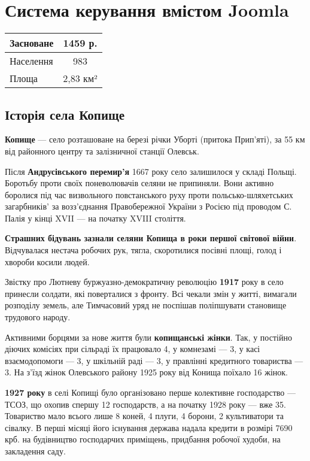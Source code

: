 \section {Система керування вмістом Joomla}


\begin{center}
	\begin{tabular}{| l | c |}
		\hline
		Засноване  & 1459 р.\\ 
		\hline
		Населення & 983 \\ 
		\hline 
		Площа & 2,83 км² \\   
		\hline
	\end{tabular}
\end{center}

\subsection{Історія села Копище}

\textbf{Копище} — село розташоване на березі річки Уборті (притока Прип’яті), за 55 км від районного центру та залізничної станції Олевськ.

Після \textbf{Андрусівського перемир’я} 1667 року село залишилося у складі Польщі. Боротьбу проти своїх поневолювачів селяни не припиняли. Вони активно боролися під час визвольного повстанського руху проти польсько-шляхетських загарбників’ за возз’єднання Правобережної України з Росією під проводом С. Палія у кінці XVII — на початку XVIII століття.

\textbf{Страшних бідувань зазнали селяни Копища в роки першої світової війни}. Відчувалася нестача робочих рук, тягла, скоротилися посівні площі, голод і хвороби косили людей.

Звістку про Лютневу буржуазно-демократичну революцію \textbf{1917} року в село принесли солдати, які поверталися з фронту. Всі чекали змін у житті, вимагали розподілу земель, але Тимчасовий уряд не поспішав поліпшувати становище трудового народу.

Активними борцями за нове життя були \textbf{копищанські жінки}. Так, у постійно діючих комісіях при сільраді їх працювало 4, у комнезамі — 3, у касі взаємодопомоги — 3, у шкільній раді — 3, у правлінні кредитного товариства — 3. На з’їзд жінок Олевського району 1925 року від Конища поїхало 16 жінок.

\textbf{1927 року} в селі Копищі було організовано перше колективне господарство — ТСОЗ, що охопив спершу 12 господарств, а на початку 1928 року — вже 35. Товариство мало всього лише 8 коней, 4 плуги, 4 борони, 2 культиватори та сівалку. В перші місяці його існування держава надала кредити в розмірі 7690 крб. на будівництво господарчих приміщень, придбання робочої худоби, на закладення саду.


